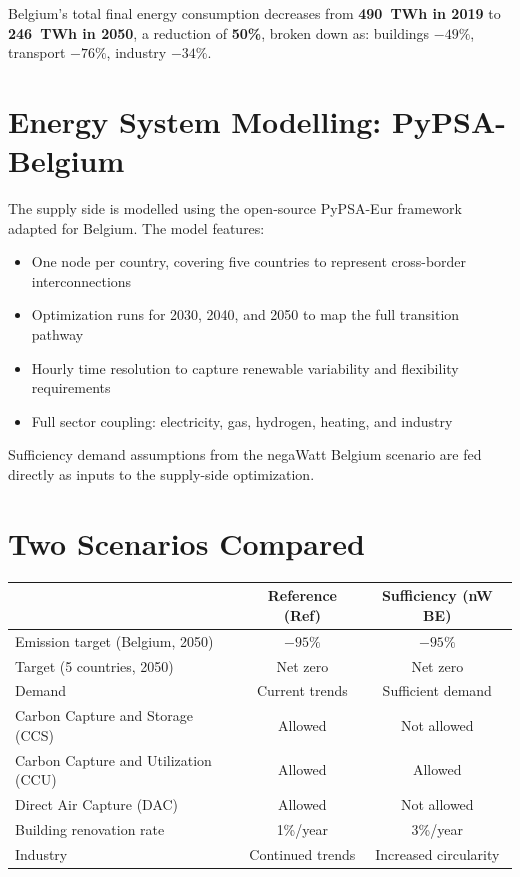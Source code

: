 Belgium's total final energy consumption decreases from \textbf{490~TWh in 2019}
to \textbf{246~TWh in 2050}, a reduction of \textbf{50\%}, broken down as:
buildings $-49\%$, transport $-76\%$, industry $-34\%$.

\section{Energy System Modelling: PyPSA-Belgium}

The supply side is modelled using the open-source PyPSA-Eur framework adapted for
Belgium. The model features:

\begin{itemize}[noitemsep]
    \item One node per country, covering five countries to represent
          cross-border interconnections
    \item Optimization runs for 2030, 2040, and 2050 to map the full
          transition pathway
    \item Hourly time resolution to capture renewable variability and
          flexibility requirements
    \item Full sector coupling: electricity, gas, hydrogen, heating, and industry
\end{itemize}

Sufficiency demand assumptions from the negaWatt Belgium scenario are fed directly
as inputs to the supply-side optimization.

\section{Two Scenarios Compared}

\begin{center}
\begin{tabular}{lcc}
\toprule
 & \textbf{Reference (Ref)} & \textbf{Sufficiency (nW BE)} \\
\midrule
Emission target (Belgium, 2050) & $-95\%$ & $-95\%$ \\
Target (5 countries, 2050) & Net zero & Net zero \\
Demand & Current trends & Sufficient demand \\
Carbon Capture and Storage (CCS) & Allowed & Not allowed \\
Carbon Capture and Utilization (CCU) & Allowed & Allowed \\
Direct Air Capture (DAC) & Allowed & Not allowed \\
Building renovation rate & 1\%/year & 3\%/year \\
Industry & Continued trends & Increased circularity \\
\bottomrule
\end{tabular}
\end{center}

